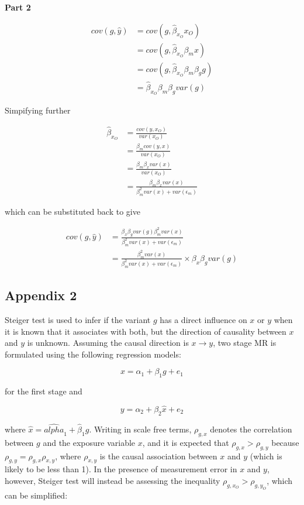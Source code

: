 \documentclass[]{article}
\begin{document}
\textbf{Part 2}

\[
\begin{aligned}
cov(g, \hat{y}) & = cov(g, \hat{\beta}_{x_O} x_O) \\
                & = cov(g, \hat{\beta}_{x_O} \beta_m x) \\
                & = cov(g, \hat{\beta}_{x_O} \beta_m \beta_g g) \\
                & = \hat{\beta}_{x_O} \beta_m \beta_g var(g)
\end{aligned}
\]

Simpifying further

\[
\begin{aligned}
\hat{\beta}_{x_O} & = \frac{cov(y, x_O)} {var(x_O)} \\
                  & = \frac{\beta_m cov(y, x)} {var(x_O)} \\
                  & = \frac{\beta_m \beta_x var(x)} {var(x_O)} \\
                  & = \frac{\beta_m \beta_x var(x)} {\beta_m^2 var(x) + var(\epsilon_m)}
\end{aligned}
\]

which can be substituted back to give

\[
\begin{aligned}
cov(g, \hat{y}) & = \frac{\beta_x\beta_g var(g) \beta_m^2 var(x)} {\beta_m^2 var(x) + var(\epsilon_m)} \\
                & = \frac{\beta_m^2 var(x)} {\beta_m^2 var(x) + var(\epsilon_m)} \times \beta_x\beta_g var(g)
\end{aligned}
\]

\newpage

\subsection{Appendix 2}\label{appendix-2}

Steiger test is used to infer if the variant \(g\) has a direct
influence on \(x\) or \(y\) when it is known that it associates with
both, but the direction of causality between \(x\) and \(y\) is unknown.
Assuming the causal direction is \(x \to y\), two stage MR is formulated
using the following regression models:

\[
x = \alpha_1 + \beta_1 g + e_1
\]

for the first stage and

\[
y = \alpha_2 + \beta_2 \hat{x} + e_2
\]

where \(\hat{x} = \hat{alpha}_1 + \hat{\beta}_1 g\). Writing in scale
free terms, \(\rho_{g, x}\) denotes the correlation between \(g\) and
the exposure variable \(x\), and it is expected that
\(\rho_{g, x} > \rho_{g, y}\) because
\(\rho_{g, y} = \rho_{g, x}\rho_{x, y}\), where \(\rho_{x, y}\) is the
causal association between \(x\) and \(y\) (which is likely to be less
than 1). In the presence of measurement error in \(x\) and \(y\),
however, Steiger test will instead be assessing the inequality
\(\rho_{g, x_O} > \rho_{g, y_O}\), which can be simplified:
\end{document}
